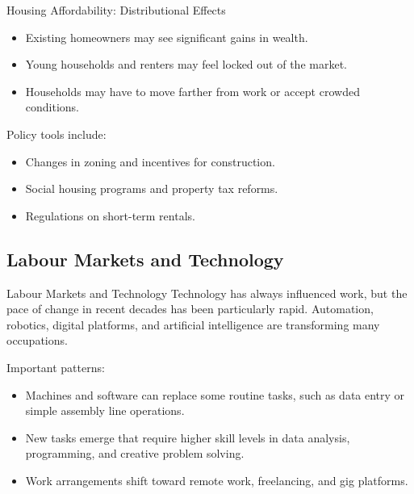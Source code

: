 \documentclass[aspectratio=169]{beamer}
\begin{document}
\begin{frame}{Housing Affordability: Distributional Effects}
  \transfade
  \begin{itemize}
    \item Existing homeowners may see significant gains in wealth.
    \item Young households and renters may feel locked out of the market.
    \item Households may have to move farther from work or accept crowded conditions.
  \end{itemize}

  \vspace{0.3cm}
  Policy tools include:
  \begin{itemize}
    \item Changes in zoning and incentives for construction.
    \item Social housing programs and property tax reforms.
    \item Regulations on short-term rentals.
  \end{itemize}
\end{frame}

\subsection{Labour Markets and Technology}

\begin{frame}{Labour Markets and Technology}
  \transfade
  Technology has always influenced work, but the pace of change in recent decades has been
  particularly rapid. Automation, robotics, digital platforms, and artificial intelligence are
  transforming many occupations.

  \vspace{0.2cm}
  Important patterns:
  \begin{itemize}
    \item Machines and software can replace some routine tasks, such as data entry or simple
    assembly line operations.
    \item New tasks emerge that require higher skill levels in data analysis, programming, and
    creative problem solving.
    \item Work arrangements shift toward remote work, freelancing, and gig platforms.
  \end{itemize}
\end{frame}
\end{document}

